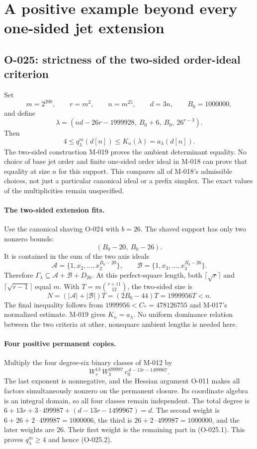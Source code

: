 \section{A positive example beyond every one-sided jet extension}

\subsection{O-025: strictness of the two-sided order-ideal criterion}
Set
\[
 m=2^{200},\qquad r=m^2,\qquad n=m^{25},\qquad d=3n,
             \qquad B_0=1000000,
\]
and define
\[
 \lambda=(nd-26r-1999928,\ B_0+6,\ B_0,\ 26^{r-3}).
                                                               \tag{O-025.1}
\]
Then
\[
                  4\leq q^m_\lambda(d[n])
                                \leq K_n(\lambda)=a_\lambda(d[n]).
                                                               \tag{O-025.2}
\]
The two-sided construction M-019 proves the ambient
determinant equality. No choice of base jet order and
finite one-sided order ideal in M-018 can prove that
equality at size $n$ for this support. This compares
all of M-018's admissible choices, not just a particular
canonical ideal or a prefix simplex.
The exact values of the multiplicities remain unspecified.

\paragraph{The two-sided extension fits.}
Use the canonical shaving O-024 with $b=26$.
The shaved support has only two nonzero bounds:
\[
                       (B_0-20,\ B_0-26).
\]
It is contained in the sum of the two axis ideals
\[
 \mathcal A=\{1,x_2,\ldots,x_2^{B_0-20}\},\qquad
 \mathcal B=\{1,x_3,\ldots,x_3^{B_0-26}\}.
\]
Therefore $\Gamma_\lambda\subseteq\mathcal A+\mathcal B+D_{26}$.
At this perfect-square length, both
$\lceil\sqrt r\rceil$ and $\lceil\sqrt{r-1}\rceil$ equal $m$.
With
$T=m\binom{r+11}{12}$, the two-sided size is
\[
          N=(|\mathcal A|+|\mathcal B|)T
                =(2B_0-44)T=1999956T<n.                \tag{O-025.3}
\]
The final inequality follows from $1999956<C_*=478126755$
and M-017's normalized estimate. M-019 gives $K_n=a_\lambda$.
No uniform dominance relation between the two criteria
at other, nonsquare ambient lengths is needed here.

\paragraph{Four positive permanent copies.}
Multiply the four degree-six binary classes of M-012 by
\[
                      W_r^{13}\,W_3^{499987}\,
                             c_0^{\,d-13r-1499967}.     \tag{O-025.4}
\]
The last exponent is nonnegative, and the Hessian argument
O-011 makes all factors simultaneously nonzero on the
permanent closure. Its coordinate algebra is an integral
domain, so all four classes remain independent.
The total degree is
$6+13r+3\cdot499987+(d-13r-1499967)=d$.
The second weight is
$6+26+2\cdot499987=1000006$, the third is
$26+2\cdot499987=1000000$, and the later weights are $26$.
Their first weight is the remaining part in (O-025.1).
This proves $q^m_\lambda\geq4$ and hence (O-025.2).

